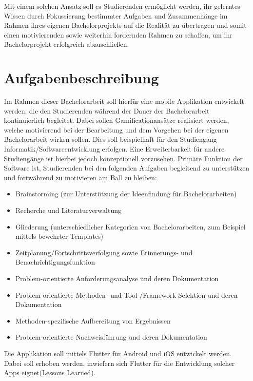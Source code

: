 \documentclass[bibliography=totoc,listof=totoc,BCOR=5mm,DIV=12,oneside]{scrbook}
\begin{document}
\par \bigskip Mit einem solchen Ansatz soll es Studierenden ermöglicht werden, ihr gelerntes Wissen durch Fokussierung bestimmter Aufgaben und Zusammenhänge im Rahmen ihres eigenen Bachelorprojekts auf die Realität zu übertragen und somit einen motivierenden sowie weiterhin fordernden Rahmen zu schaffen, um ihr Bachelorprojekt erfolgreich abzuschließen.

\section{Aufgabenbeschreibung}
Im Rahmen dieser Bachelorarbeit soll hierfür eine mobile Applikation entwickelt werden, die den Studierenden während der Dauer der Bachelorarbeit kontinuierlich \grqq begleitet\grqq . Dabei sollen Gamificationansätze realisiert werden, welche motivierend bei der Bearbeitung und dem Vorgehen bei der eigenen Bachelorarbeit wirken sollen. Dies soll beispielhaft für den Studiengang Informatik/Softwareentwicklung erfolgen. Eine Erweiterbarkeit für andere Studiengänge ist hierbei jedoch konzeptionell vorzusehen.
Primäre Funktion der Software ist, Studierenden bei den folgenden Aufgaben begleitend zu unterstützen und fortwährend zu motivieren \grqq am Ball zu bleiben\grqq:
\begin{itemize}
\item Brainstorming (zur Unterstützung der Ideenfindung für Bachelorarbeiten)
\item Recherche und Literaturverwaltung
\item Gliederung (unterschiedlicher Kategorien von Bachelorarbeiten, zum Beispiel mittels bewehrter Templates)
\item Zeitplanung/Fortschrittsverfolgung sowie Erinnerungs- und Benachrichtigungsfunktion 
\item Problem-orientierte Anforderungsanalyse und deren Dokumentation
\item Problem-orientierte Methoden- und Tool-/Framework-Selektion und deren Dokumentation
\item Methoden-spezifische Aufbereitung von Ergebnissen
\item Problem-orientierte Nachweisführung und deren Dokumentation
\end{itemize}
Die Applikation soll mittels Flutter für Android und iOS entwickelt werden. Dabei soll erhoben werden, inwiefern sich Flutter für die Entwicklung solcher Apps eignet(Lessons Learned). 
\end{document}
